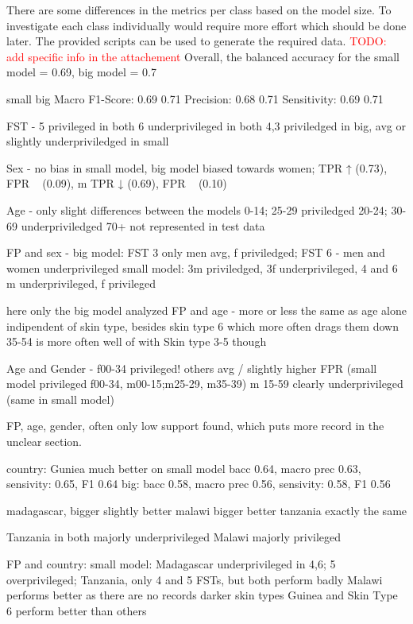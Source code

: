 \documentclass[12pt, a4paper, oneside]{book}   	%
\renewcommand{\todo}[1]{\textcolor{red}{TODO: #1}}
\begin{document}
			There are some differences in the metrics per class based on the model size. To investigate each class individually would require more effort which should be done later. The provided scripts can be used to generate the required data. \todo{add specific info in the attachement}
			Overall, the balanced accuracy for the small model = 0.69, big model = 0.7
			
							small	big
			Macro F1-Score: 0.69	0.71
			Precision: 		0.68	0.71
			Sensitivity:	0.69	0.71
			
			FST - 5 privileged in both
			6 underprivileged in both
			4,3 priviledged in big, avg or slightly underpriviledged in small
			
			Sex - no bias in small model, big model biased towards women; TPR ↑ (0.73), FPR ~ (0.09), m TPR ↓ (0.69), FPR ~ (0.10)
			
			Age - only slight differences between the models
			0-14; 25-29 priviledged
			20-24; 30-69 underpriviledged
			70+ not represented in test data	
			
			FP and sex - big model: FST 3 only men avg, f priviledged; FST 6 - men and women underprivileged
			small model: 3m priviledged, 3f underprivileged, 4 and 6 m underprivileged, f privileged
			
			
			
			here only the big model analyzed
			FP and age - more or less the same as age alone indipendent of skin type, besides skin type 6 which more often drags them down
			35-54 is more often well of with Skin type 3-5 though
			
			
			Age and Gender - f00-34 privileged! others avg / slightly higher FPR (small model privileged f00-34, m00-15;m25-29, m35-39)
			m 15-59 clearly underprivileged (same in small model)
			
			
			FP, age, gender, often only low support found, which puts more record in the unclear section.  
			
			
			country: Guniea much better on small model
			bacc 0.64, macro prec 0.63, sensivity: 0.65, F1 0.64
			big:
			bacc 0.58, macro prec 0.56, sensivity: 0.58, F1 0.56
						
			madagascar, bigger slightly better
			malawi bigger better
			tanzania exactly the same
			
			Tanzania in both majorly underprivileged
			Malawi majorly privileged
			
			FP and country: small model: Madagascar underprivileged in 4,6; 5 overprivileged;  
			Tanzania, only 4 and 5 FSTs, but both perform badly
			Malawi performs better as there are no records darker skin types
			Guinea and Skin Type 6 perform better than others
			
\end{document}
